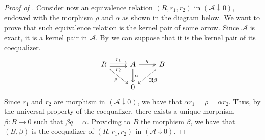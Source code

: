 \begin{subbox}{}
\begin{proof}[\textit{Proof of }]
    Consider now an equivalence relation $(R,r_1,r_2)$ in $(\mathcal{A} \downarrow 0)$, endowed with the morphism $\rho$ and $\alpha$ as shown in the diagram below. We want to prove that such equivalence relation is the kernel pair of some arrow. Since $\mathcal{A}$ is exact, it is a kernel pair in $\mathcal{A}$. By  we can suppose that it is the kernel pair of its coequalizer.
    \[
\begin{tikzcd}
    R \arrow[r, "r_2"', shift right] \arrow[r, "r_1", shift left] \arrow[rd, "\rho"'] & A \arrow[r, "q", two heads] \arrow[d, "\alpha"] & B \arrow[ld, "\exists! \beta", dashed] \\
                                                                                      & 0                                               &                                       
    \end{tikzcd}
    \]
    Since $r_1$ and $r_2$ are morphism in $(\mathcal{A} \downarrow 0)$, we have that $\alpha r_1 = \rho = \alpha r_2$. Thus, by the universal property of the coequalizer, there exists a unique morphism $\beta: B \to 0$ such that $\beta q = \alpha$. Providing to $B$ the morphism $\beta$, we have that $(B,\beta)$ is the coequalizer of $(R,r_1,r_2)$ in $(\mathcal{A} \downarrow 0)$.


\end{proof}
\end{subbox}
